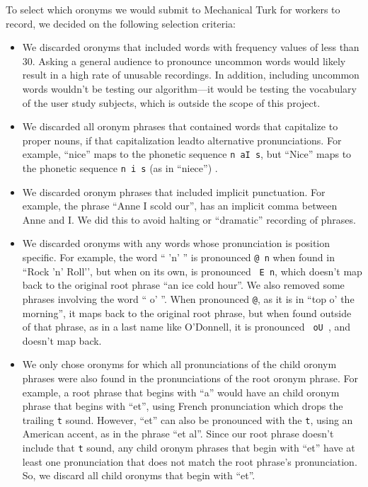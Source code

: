 To select which oronyms we would submit to Mechanical Turk for workers to record, we decided on the following selection criteria:
\begin{itemize}
\item We discarded oronyms that included words with frequency values of less than 30.  Asking a general audience to pronounce uncommon words would likely result in a high rate of unusable recordings. In addition, including uncommon words wouldn’t be testing our algorithm---it would be testing the vocabulary of the user study subjects, which is outside the scope of this project.
\item We discarded all oronym phrases that contained words that capitalize to proper nouns, if that capitalization leadto alternative pronunciations.  For example, ``nice'' maps to the phonetic sequence \texttt{n aI s}, but ``Nice'' maps to the phonetic sequence \texttt{n i s} (as in ``niece'') .  
\item We discarded oronym phrases that included implicit punctuation. For example, the phrase ``Anne I scold our'', has an implicit comma between Anne and I.  We did this to avoid halting or ``dramatic'' recording of phrases.
\item We discarded oronyms with any words whose pronunciation is position specific. For example, the word `` 'n' '' is pronounced \texttt{@ n} when found in ``Rock 'n' Roll’’, but when on its own, is pronounced \texttt{ E n}, which doesn't map back to the original root phrase ``an ice cold hour''. We also removed some phrases involving the word  `` o' ''.  When pronounced \texttt{@}, as it is in ``top o' the morning'', it maps back to the original root phrase, but when found outside of that phrase, as in a last name like O'Donnell, it is pronounced \texttt{ oU }, and doesn't map back.
\item We only chose oronyms for which all pronunciations of the child oronym phrases were also found in the pronunciations of the root oronym phrase. For example, a root phrase that begins with ``a'' would have an child oronym phrase that begins with ``et'', using French pronunciation which drops the trailing \texttt{t} sound. However, ``et'' can also be pronounced with the \texttt{t}, using an American accent, as in the phrase ``et al''. Since our root phrase doesn’t include that \texttt{t} sound, any child oronym phrases that begin with ``et'' have at least one pronunciation that does not match the root phrase's pronunciation.  So, we discard all child oronyms that begin with ``et''.
\end{itemize}

